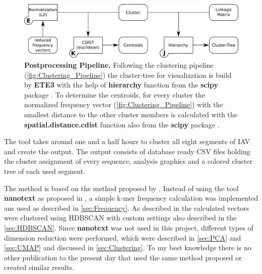\begin{figure}[!hbt]
    \centering
    \includegraphics[width=\textwidth]{Graphics/Tree.pdf}
    \caption[Postprocessing Pipeline]{\textbf{Postprocessing Pipeline.} Following the clustering pipeline (\autoref{fig:Clustering_Pipeline}) the cluster-tree for visualization is build by \textbf{ETE3} with the help of \textbf{hierarchy} function from the \textbf{scipy} package \autocite{huerta-cepas_ete_2016, scipy_10_contributors_scipy_2020}. To determine the centroids, for every cluster the normalized frequency vector (\autoref{fig:Clustering_Pipeline}) with the smallest distance to the other cluster members is calculated with the \textbf{spatial.distance.cdist} function also from the \textbf{scipy} package \autocite{scipy_10_contributors_scipy_2020}.}
    \label{fig:Tree_Pipeline}
\end{figure}

The tool takes around one and a half hours to cluster all eight segments of \gls{IAV} and create the output. The output consists of database ready CSV files holding the cluster assignment of every sequence, analysis graphics and a colored cluster tree of each used segment.

The method is based on the method proposed by \autocite{viehweger_addressing_2019}. Instead of using the tool \textbf{nanotext} as proposed in \autocite{viehweger_encoding_2019}, a simple k-mer frequency calculation was implemented ans used as described in \autoref{sec:Frequency}. As described in \autocite{viehweger_addressing_2019} the calculated vectors were clustered using \gls{HDBSCAN} with custom settings also described in the \autoref{sec:HDBSCAN}. Since \textbf{nanotext} was not used in this project, different types of dimension reduction were performed, which were described in \autoref{sec:PCA} and \autoref{sec:UMAP} and discussed in \autoref{sec:Clustering}. To my best knowledge there is no other publication to the present day that used the same method proposed or created similar results.

\nopagebreak[1]













